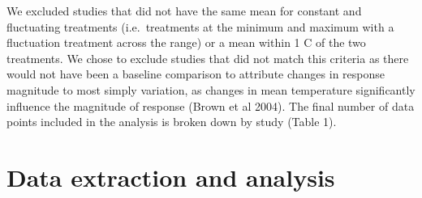 \documentclass[12pt,twoside]{reedthesis}
\begin{document}
We excluded studies that did not have the same mean for constant and fluctuating treatments (i.e.~treatments at the minimum and maximum with a fluctuation treatment across the range) or a mean within 1 C of the two treatments. We chose to exclude studies that did not match this criteria as there would not have been a baseline comparison to attribute changes in response magnitude to most simply variation, as changes in mean temperature significantly influence the magnitude of response (Brown et al 2004). The final number of data points included in the analysis is broken down by study (Table 1).

\hypertarget{data-extraction-and-analysis}{%
\section{Data extraction and analysis}\label{data-extraction-and-analysis}}
\end{document}
